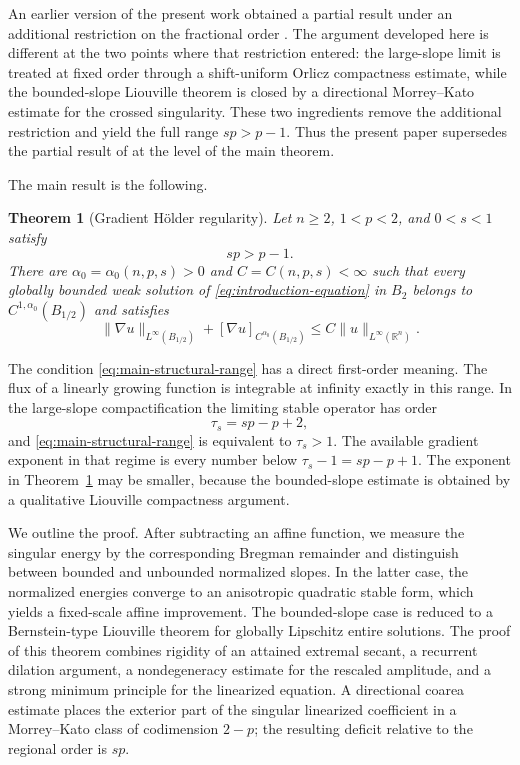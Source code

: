 \documentclass[11pt,reqno]{amsart}
\numberwithin{equation}{section}
\newcommand{\R}{\mathbb R}
\newtheorem{theorem}{Theorem}[section]
\theoremstyle{remark}
\begin{document}
An earlier version of the present work obtained a partial result under
an additional restriction on the fractional order
\cite{ZhangPartial}.  The argument developed here is different at the
two points where that restriction entered: the large-slope limit is
treated at fixed order through a shift-uniform Orlicz compactness
estimate, while the bounded-slope Liouville theorem is closed by a
directional Morrey--Kato estimate for the crossed singularity.  These
two ingredients remove the additional restriction and yield the full
range \(sp>p-1\).  Thus the present paper supersedes the partial result
of \cite{ZhangPartial} at the level of the main theorem.

The main result is the following.

\begin{theorem}[Gradient H\"older regularity]
\label{thm:main}
Let \(n\ge2\), \(1<p<2\), and \(0<s<1\) satisfy
\begin{equation}
 sp>p-1.
 \label{eq:main-structural-range}
\end{equation}
There are \(\alpha_0=\alpha_0(n,p,s)>0\) and
\(C=C(n,p,s)<\infty\) such that every globally bounded weak solution of
\eqref{eq:introduction-equation} in \(B_2\) belongs to
\(C^{1,\alpha_0}(B_{1/2})\) and satisfies
\begin{equation}
 \|\nabla u\|_{L^\infty(B_{1/2})}
 +[\nabla u]_{C^{\alpha_0}(B_{1/2})}
 \le C\|u\|_{L^\infty(\R^n)}.
 \label{eq:fixed-order-gradient-holder-estimate}
\end{equation}
\end{theorem}

The condition \eqref{eq:main-structural-range} has a direct first-order
meaning.  The flux of a linearly growing function is integrable at
infinity exactly in this range.  In the large-slope compactification the
limiting stable operator has order
\[
 \tau_s=sp-p+2,
\]
and \eqref{eq:main-structural-range} is equivalent to \(\tau_s>1\).
The available gradient exponent in that regime is every number below
\(\tau_s-1=sp-p+1\).  The exponent in Theorem~\ref{thm:main} may be
smaller, because the bounded-slope estimate is obtained by a qualitative
Liouville compactness argument.

We outline the proof.  After subtracting an affine function, we measure
the singular energy by the corresponding Bregman remainder and distinguish
between bounded and unbounded normalized slopes.  In the latter case,
the normalized energies converge to an anisotropic quadratic stable
form, which yields a fixed-scale affine improvement.  The bounded-slope
case is reduced to a Bernstein-type Liouville theorem for globally
Lipschitz entire solutions.  The proof of this theorem combines rigidity
of an attained extremal secant, a recurrent dilation argument, a
nondegeneracy estimate for the rescaled amplitude, and a strong minimum
principle for the linearized equation.  A directional coarea estimate
places the exterior part of the singular linearized coefficient in a
Morrey--Kato class of codimension \(2-p\); the resulting deficit relative
to the regional order is \(sp\).
\end{document}
